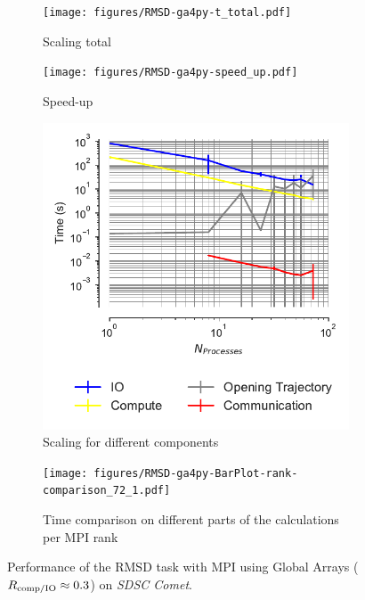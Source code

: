 \begin{figure}[!htb]
  \centering
  \begin{subfigure}{.49\textwidth}
    \texttt{[image: figures/RMSD-ga4py-t\_total.pdf]}
    \captionsetup{format=hang}
    \caption{Scaling total}
    \label{fig:MPIscaling-ga4py}
  \end{subfigure}
  \hfill
  \begin{subfigure}{.49\textwidth}
    \texttt{[image: figures/RMSD-ga4py-speed\_up.pdf]}
    \captionsetup{format=hang}
    \caption{Speed-up}
    \label{fig:MPIspeedup-ga4py}
  \end{subfigure}
  \bigskip

  \begin{subfigure}{.49\textwidth}
    \includegraphics[width=\linewidth]{figures/RMSD-ga4py-time_IO_comparison.pdf}
    \captionsetup{format=hang}
    \caption{Scaling for different components}
    \label{fig:ScalingComputeIO-ga4py}
  \end{subfigure}
  \hfill
  \begin{subfigure} {.5\textwidth}
    \texttt{[image: figures/RMSD-ga4py-BarPlot-rank-comparison\_72\_1.pdf]}
    \captionsetup{format=hang}
    \caption{Time comparison on different parts of the calculations per MPI rank}
    \label{fig:MPIranks-ga4py}
  \end{subfigure}
  \caption{Performance of the RMSD task with MPI using Global Arrays ($R_{\text{comp/IO}} \approx 0.3$) on \emph{SDSC Comet}.
}
\end{figure}
